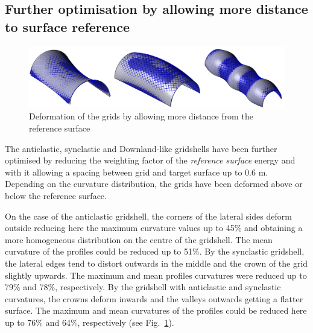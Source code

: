 \subsection{Further optimisation by allowing more distance to surface reference}

\begin{figure}[t]
\centering
\includegraphics[width=1.0\linewidth]{images/CaseStudies_Regular/Compass_SurfaceComparison.png}
\caption{Deformation of the grids by allowing more distance from the reference surface}
\label{fig:Compass_SurfaceComparison}
\end{figure}

The anticlastic, synclastic and Downland-like gridshells have been further optimised by reducing the weighting factor of the {\it reference surface} energy and with it allowing a spacing between grid and target surface up to 0.6 m. Depending on the curvature distribution, the grids have been deformed above or below the reference surface.

On the case of the anticlastic gridshell, the corners of the lateral sides deform outside reducing here the maximum curvature values up to 45\% and obtaining a more homogeneous distribution on the centre of the gridshell. The mean curvature of the profiles could be reduced up to 51\%. By the synclastic gridshell, the lateral edges tend to distort outwards in the middle and the crown of the grid slightly upwards. The maximum and mean profiles curvatures were reduced up to 79\% and 78\%, respectively. By the gridshell with anticlastic and synclastic curvatures, the crowns deform inwards and the valleys outwards getting a flatter surface. The maximum and mean curvatures of the profiles could be reduced here up to 76\% and 64\%, respectively (see Fig.~\ref{fig:Compass_SurfaceComparison}).

